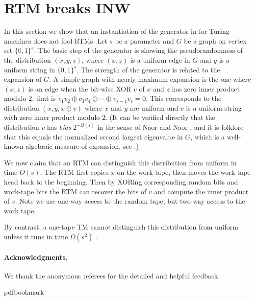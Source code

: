 \documentclass[11pt]{article}
\numberwithin{equation}{section}
\theoremstyle{definition}
\theoremstyle{plain}
\newcommand{\zo}{\{0, 1\}}
\begin{document}
\section{RTM breaks INW \label{sec:RTM-breaks-INW}}

In this section we show that an instantiation of the generator in
\cite{INW94} for Turing machines does not fool RTMs. Let $s$ be
a parameter and $G$ be a graph on vertex set $\zo^{s}$. The basic
step of the \cite{INW94} generator is showing the pseudorandomness
of the distribution $(x,y,z)$, where $(x,z)$ is a uniform edge in
$G$ and $y$ is a uniform string in $\zo^{s}$. The strength of the
generator is related to the expansion of $G$. A simple graph with
nearly maximum expansion is the one where $(x,z)$ is an edge when
the bit-wise XOR $v$ of $x$ and $z$ has zero inner product modulo
$2$, that is $v_{1}v_{2}\oplus v_{3}v_{4}\oplus\cdots\oplus v_{s-1}v_{s}=0$.
This corresponds to the distribution $(x,y,x\oplus v)$ where $x$
and $y$ are uniform and $v$ is a uniform string with zero inner
product modulo $2$. (It can be verified directly that the distribution
$v$ has \emph{bias} $2^{-\Omega(s)}$ in the sense of Naor and Naor
\cite{NaN93}, and it is folklore that this equals the normalized
second largest eigenvalue in $G$, which is a well-known algebraic
measure of expansion, see \cite{HooryLW06}.)

We now claim that an RTM can distinguish this distribution from uniform
in time $O(s)$. The RTM first copies $x$ on the work tape, then
moves the work-tape head back to the beginning. Then by XORing corresponding
random bits and work-tape bits the RTM can recover the bits of $v$
and compute the inner product of $v$. Note we use one-way access
to the random tape, but two-way access to the work tape.

By contrast, a one-tape TM cannot distinguish this distribution from
uniform unless it runs in time $\Omega(s^{2})$ \cite{INW94}.

\paragraph{Acknowledgments.}

We thank the anonymous referees for the detailed and helpful feedback.

\newcommand{\prelim}{Preliminary version in\ }\newcommand{\prelims}{Preliminary
  versions in\ }
\providecommand{\bibhead}[1]{}
\expandafter\ifx\csname pdfbookmark\endcsname\relax%
  \providecommand{\tocrefpdfbookmark}{}
\else\providecommand{\tocrefpdfbookmark}{%
   \hypertarget{tocreferences}{}%
   \pdfbookmark[1]{References}{tocreferences}}%
\fi
\end{document}
